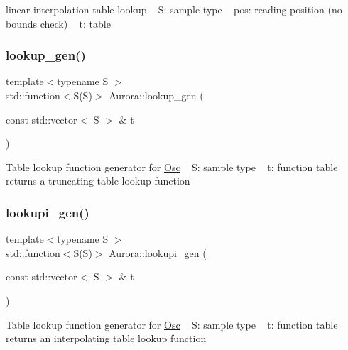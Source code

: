 linear interpolation table lookup ~\newline
S\+: sample type ~\newline
pos\+: reading position (no bounds check) ~\newline
t\+: table \mbox{\label{namespace_aurora_ade912bee8dbe0351b2193809ce592d8b}} 
\subsubsection{\texorpdfstring{lookup\+\_\+gen()}{lookup\_gen()}}
{\footnotesize\ttfamily template$<$typename S $>$ \\
std\+::function$<$S(S)$>$ Aurora\+::lookup\+\_\+gen (\begin{DoxyParamCaption}\item[{const std\+::vector$<$ S $>$ \&}]{t }\end{DoxyParamCaption})}

Table lookup function generator for \hyperlink{class_aurora_1_1_osc}{Osc} ~\newline
S\+: sample type ~\newline
t\+: function table ~\newline
returns a truncating table lookup function \mbox{\label{namespace_aurora_a043c55515e053a8d6f31ed7077a1bea6}} 
\subsubsection{\texorpdfstring{lookupi\+\_\+gen()}{lookupi\_gen()}}
{\footnotesize\ttfamily template$<$typename S $>$ \\
std\+::function$<$S(S)$>$ Aurora\+::lookupi\+\_\+gen (\begin{DoxyParamCaption}\item[{const std\+::vector$<$ S $>$ \&}]{t }\end{DoxyParamCaption})}

Table lookup function generator for \hyperlink{class_aurora_1_1_osc}{Osc} ~\newline
S\+: sample type ~\newline
t\+: function table ~\newline
returns an interpolating table lookup function \mbox{\label{namespace_aurora_a49b6f6d92479d80271ced42627154066}} 
